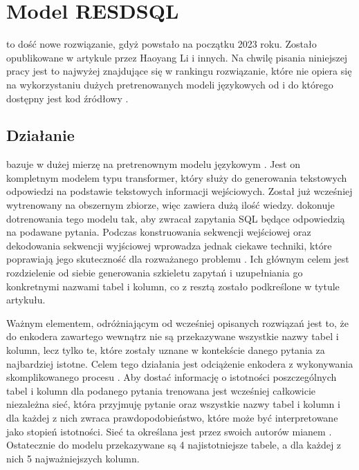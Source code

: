\section{Model RESDSQL}
 to dość nowe rozwiązanie, gdyż powstało na początku 2023 roku. Zostało opublikowane w artykule   przez Haoyang Li i innych. Na chwilę pisania niniejszej pracy jest to najwyżej znajdujące się w rankingu  rozwiązanie, które nie opiera się na wykorzystaniu dużych pretrenowanych modeli językowych od  i do którego dostępny jest kod źródłowy .

\subsection{Działanie}
 bazuje w dużej mierzę na pretrenownym modelu językowym  . Jest on kompletnym modelem typu transformer, który służy do generowania tekstowych odpowiedzi na podstawie tekstowych informacji wejściowych. Został już wcześniej wytrenowany na obszernym zbiorze, więc zawiera dużą ilość wiedzy.  dokonuje dotrenowania tego modelu tak, aby zwracał zapytania SQL będące odpowiedzią na podawane pytania. Podczas konstruowania sekwencji wejściowej oraz dekodowania sekwencji wyjściowej wprowadza jednak ciekawe techniki, które poprawiają jego skuteczność dla rozważanego problemu . Ich głównym celem jest rozdzielenie od siebie generowania szkieletu zapytań i uzupełniania go konkretnymi nazwami tabel i kolumn, co z resztą zostało podkreślone w tytule artykułu.

Ważnym elementem, odróżniającym  od wcześniej opisanych rozwiązań jest to, że do enkodera zawartego wewnątrz  nie są przekazywane wszystkie nazwy tabel i kolumn, lecz tylko te, które zostały uznane w kontekście danego pytania za najbardziej istotne. Celem tego działania jest odciążenie enkodera z wykonywania skomplikowanego procesu . Aby dostać informację o istotności poszczególnych tabel i kolumn dla podanego pytania trenowana jest wcześniej całkowicie niezależna sieć, która przyjmuję pytanie oraz wszystkie nazwy tabel i kolumn i dla każdej z nich zwraca prawdopodobieństwo, które może być interpretowane jako stopień istotności. Sieć ta określana jest przez swoich autorów mianem . Ostatecznie do modelu  przekazywane są 4 najistotniejsze tabele, a dla każdej z nich 5 najważniejszych kolumn.

